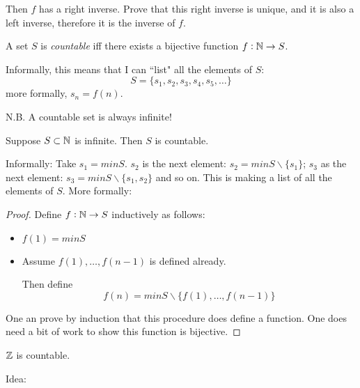 \documentclass[twoside]{scrartcl}
\begin{document}
Then $f$ has a right inverse. Prove that this right inverse is unique, and it is also a left inverse, therefore it is the inverse of $f$.\\



\vspace*{5pt}

\begin{definition}
A set $S$ is \emph{countable} iff there exists a bijective function $f: \mathbb{N} \to S$. 	
\end{definition}\vspace*{5pt}

Informally, this means that I can ``list" all the elements of $S$: 
\[S = \{s_1,s_2,s_3,s_4,s_5,\dots\}\]
more formally, $s_n = f(n)$. 

N.B. A countable set is always infinite! \\


\begin{proposition}
Suppose $S \subset \mathbb{N}$ is infinite. Then $S$ is countable. 	
\end{proposition}

Informally: Take $s_1 = min S$. $s_2$ is the next element: $s_2 = min S \backslash\{s_1\}$; $s_3$ as the next element: $s_3 = min S \backslash\{s_1,s_2\}$ and so on. This is making a list of all the elements of $S$. More formally:

\begin{proof}
	Define $f: \mathbb{N} \to S$ inductively as follows: 
	\begin{itemize}
	\item $f(1) = min S$
	\item Assume $f(1),\dots, f(n-1)$ is defined already. 
	
	Then define 
	\[f(n) = min S \backslash \{f(1),\dots,f(n-1)\}\]	
	\end{itemize}
	One an prove by induction that this procedure does define a function. One does need a bit of work to show this function is bijective. 
\end{proof}\vspace*{5pt}


\begin{proposition} 
$\mathbb{Z}$ is countable. 
\end{proposition}

Idea: 
\begin{center}
\end{center}
\end{document}
